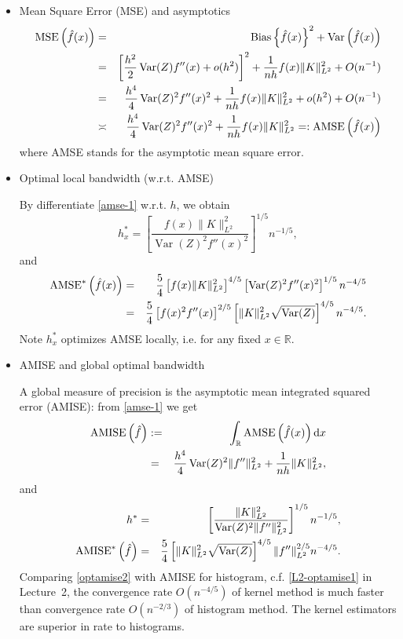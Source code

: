 \documentclass[19pt,landscape]{article}
\newcommand{\R}{\mathbb{R}}
\DeclareMathOperator{\var}{\mathrm{Var}}
\DeclareMathOperator{\bs}{\mathrm{Bias}}
\begin{document}
\begin{itemize}
    \item Mean Square Error (MSE) and asymptotics 
\begin{eqnarray}
    {\rm MSE}\left(\hat{f}(x)\right)&=&\bs\left\{\hat{f}(x)\right\}^2+\var\left(\hat{f}(x)\right)\nonumber\\
    &=&\left[\frac{h^2}2\var(Z)f''(x)+o(h^2)\right]^2+\frac1{nh}f(x)\|K\|_{L^2}^2+O(n^{-1})\nonumber\\
    &=&\frac{h^4}4\var(Z)^2f''(x)^2+\frac1{nh}f(x)\|K\|_{L^2}^2+o(h^2)+O(n^{-1})\\
    &\asymp&\frac{h^4}4\var(Z)^2f''(x)^2+\frac1{nh}f(x)\|K\|_{L^2}^2=:{\rm AMSE}\left(\hat{f}(x)\right)\label{amse-1}
\end{eqnarray}
where {\rm AMSE} stands for the asymptotic mean square error. 
\item Optimal local bandwidth (w.r.t. AMSE)

By differentiate \eqref{amse-1} w.r.t. $h$, we obtain 
\begin{equation}
    h^*_x=\left[\frac{f(x)\|K\|_{L^2}^2}{\var(Z)^2f''(x)^2}\right]^{1/5}n^{-1/5},
\end{equation}
and 
\begin{eqnarray}
    {\rm AMSE}^*\left(\hat{f}(x)\right)&=&\frac54\left[f(x)\|K\|_{L^2}^2\right]^{4/5}\left[\var(Z)^2f''(x)^2\right]^{1/5}n^{-4/5}\\
    &=&\frac54\left[f(x)^2f''(x)\right]^{2/5}\left[\|K\|_{L^2}^2\sqrt{\var(Z)}\right]^{4/5}n^{-4/5}.
\end{eqnarray}
Note $h^*_x$ optimizes AMSE locally, i.e. for any fixed $x\in\R$. 
\item AMISE and global optimal bandwidth 

A global measure of precision is the asymptotic mean integrated squared error (AMISE): from \eqref{amse-1} we get 
\begin{eqnarray}
    {\rm AMISE}\left(\hat{f}\right)&:=&\int_{\R}{\rm AMSE}\left(\hat{f}(x)\right)\mathrm{d}x\\
    &=&\frac{h^4}4\var(Z)^2\|f''\|_{L^2}^2+\frac1{nh}\|K\|_{L^2}^2,
\end{eqnarray}
and 
\begin{eqnarray}
    h^*&=&\left[\frac{\|K\|_{L^2}^2}{\var(Z)^2\|f''\|_{L^2}^2}\right]^{1/5}n^{-1/5},\\
    {\rm AMISE}^*\left(\hat{f}\right)&=&\frac54\left[\|K\|^2_{L^2}\sqrt{\var(Z)}\right]^{4/5}\|f''\|_{L^2}^{2/5}n^{-4/5}. \label{optamise2}
\end{eqnarray}
Comparing \eqref{optamise2} with AMISE for histogram, c.f. \eqref{L2-optamise1} in Lecture~2, the convergence rate $O(n^{-4/5})$ of kernel method is much faster than convergence rate $O(n^{-2/3})$  of histogram method. The kernel estimators are superior in rate to histograms. 


\end{itemize}
\end{document}
